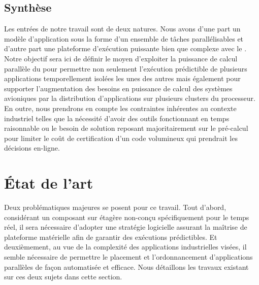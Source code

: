 \documentclass[main.tex]{subfiles}
\begin{document}

\subsection{Synthèse}
Les entrées de notre travail sont de deux natures. Nous avons d'une part un modèle d'application sous la forme d'un ensemble de tâches parallélisables et d'autre part une plateforme d'exécution puissante bien que complexe avec le \mppalong. Notre objectif sera ici de définir le moyen d'exploiter la puissance de calcul parallèle du \mppalong pour permettre non seulement l'exécution prédictible de plusieurs applications temporellement isolées les unes des autres mais également pour supporter l'augmentation des besoins en puissance de calcul des systèmes avioniques par la distribution d'applications sur plusieurs clusters du processeur. En outre, nous prendrons en compte les contraintes inhérentes au contexte industriel telles que la nécessité d'avoir des outils fonctionnant en temps raisonnable ou le besoin de solution reposant majoritairement sur le pré-calcul pour limiter le coût de certification d'un code volumineux qui prendrait les décisions en-ligne.

\section{État de l'art}

Deux problématiques majeures se posent pour ce travail. Tout d'abord, considérant un composant sur étagère non-conçu spécifiquement pour le temps réel, il sera nécessaire d'adopter une stratégie logicielle assurant la maîtrise de plateforme matérielle afin de garantir des exécutions prédictibles. Et deuxièmement, au vue de la complexité des applications industrielles visées, il semble nécessaire de permettre le placement et l'ordonnancement d'applications parallèles de façon automatisée et efficace. Nous détaillons les travaux existant sur ces deux sujets dans cette section.
\end{document}
